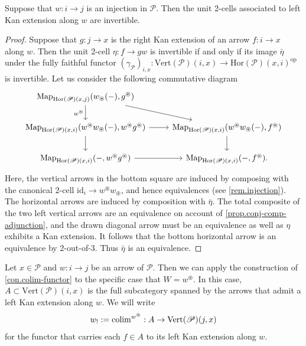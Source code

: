 \documentclass[a4paper, 11pt]{amsart}
\numberwithin{theorem}{section}
\theoremstyle{definition}
\newcommand{\op}{\mathrm{op}}
\newcommand{\map}{\mathrm{Map}}
\def\colim{\qopname\relax m{colim}}
\renewcommand{\P}{\mathscr{P}}
\renewcommand{\Vert}{\mathrm{Vert}}
\newcommand{\Hor}{\mathrm{Hor}}
\newcommand{\id}{\mathrm{id}}
\begin{document}
\begin{proposition}\label{cor.unit-pke-ff}
	Suppose that $w : i \rightarrow j$ is an injection in $\P$. Then the unit 2-cells
	associated to left Kan extension along $w$ are invertible.
\end{proposition}
\begin{proof}
	Suppose that $g : j \rightarrow x$ is the right Kan extension of an arrow $f : i \rightarrow x$ along $w$. 
	Then the unit 2-cell $\eta : f \rightarrow gw$ is invertible if and only if its image $\bar{\eta}$ under the fully faithful functor 
	$(\gamma_\P)_{i,x} : \Vert(\P)(i,x) \rightarrow \Hor(\P)(x,i)^\op$ is invertible. 
	Let us consider the following commutative diagram
	\[
	\begin{tikzcd}
		\map_{\Hor(\P)(x,j)}(w_\circledast(-), g^\circledast)\arrow[d, "w^\circledast"']\arrow[dr]\\ 
		 \map_{\Hor(\P)(x,i)}(w^\circledast w_\circledast(-), w^\circledast g^\circledast) \arrow[r]\arrow[d] & \map_{\Hor(\P)(x,i)}(w^\circledast w_\circledast(-), f^\circledast) \arrow[d] \\
		 \map_{\Hor(\P)(x,i)}(-, w^\circledast g^\circledast) \arrow[r] & \map_{\Hor(\P)(x,i)}(-, f^\circledast).
	\end{tikzcd}
	\]
	Here, the vertical arrows in the bottom square are induced by composing with the canonical 2-cell $\id_i \rightarrow w^\circledast w_\circledast$, 
	and hence equivalences (see \cref{rem.injection}).
	The horizontal arrows are induced by composition with $\bar{\eta}$. The total composite of the two left vertical arrows are an equivalence on account of \cref{prop.conj-comp-adjunction},
	and  the drawn diagonal 
	arrow must be an equivalence as well as $\eta$ exhibits a Kan extension. It follows that the bottom horizontal arrow is an equivalence by 2-out-of-3. Thus $\bar{\eta}$ is an equivalence.
\end{proof}

\begin{notation}\label{not.external-pke}
	Let $x \in \P$ and $w : i \rightarrow j$ be an arrow of $\P$. Then we can apply the construction of \cref{con.colim-functor} to the specific case that $W = w^\circledast$. In this case, 
	$A \subset \Vert(\P)(i,x)$ is the full subcategory spanned by the arrows that admit a left Kan extension along $w$. We will write 
	$$
	w_! := {\colim}^{w^\circledast} : A \rightarrow \Vert(\P)(j,x)
	$$
	for the functor that carries each $f \in A$ to its left Kan extension along $w$.
\end{notation}
\end{document}
